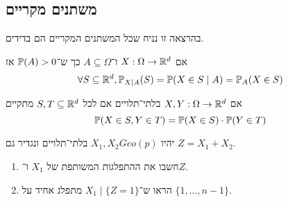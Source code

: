 \subsection{משתנים מקריים}
בהרצאה זו נניח שכל המשתנים המקריים הם בדידים.
\begin{definition}
	אם $X : \Omega \to \mathbb{R}^d$ ו־$A \subseteq \Omega$ כך ש־$\mathbb{P}(A) > 0$ אז
	\[
		\forall S \subseteq \mathbb{R}^d, \mathbb{P}_{X \mid A}(S) = \mathbb{P}(X \in S \mid A) = \mathbb{P}_A(X \in S)
	\]
\end{definition}
\begin{definition}
	אם $X, Y : \Omega \to \mathbb{R}^d$ בלתי־תלויים אם לכל $S, T \subseteq \mathbb{R}^d$ מתקיים
	\[
		\mathbb{P}(X \in S, Y \in T) = \mathbb{P}(X \in S) \cdot \mathbb{P}(Y \in T)
	\]
\end{definition}
\begin{exercise}
	יהיו $X_1, X_2 Geo(p)$ בלתי־תלויים ונגדיר גם $Z = X_1 + X_2$.
	\begin{enumerate}
		\item חשבו את ההתפלגות המשותפת של $X_1$ ו־$Z$.
		\item הראו ש־$X_1 \mid \{ Z = 1 \}$ מתפלג אחיד על $\{1, \dots, n - 1\}$.
	\end{enumerate}
\end{exercise}
